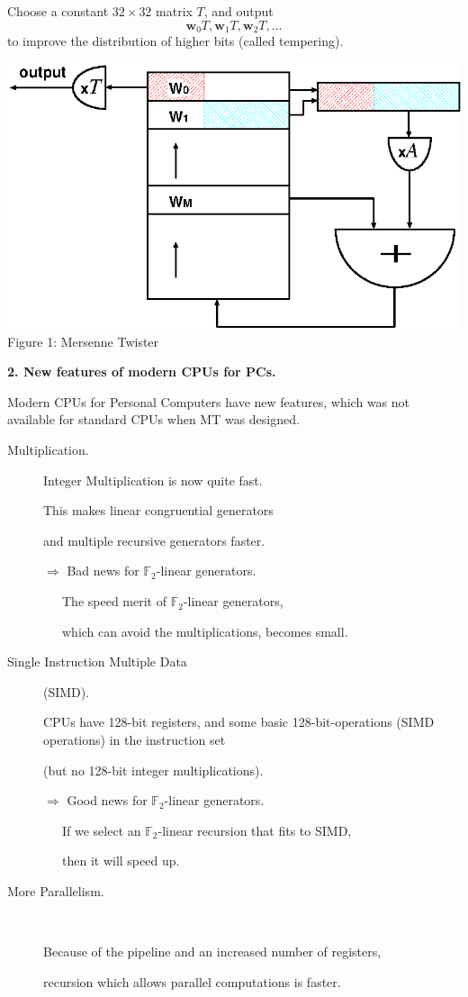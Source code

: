 \documentclass[a4j,12pt,landscape]{jarticle}
\def\F2{{\mathbb F}_2}
\def\bw{{{\mathbf w}}}
\begin{document}
Choose a constant $32\times 32$ matrix $T$, 
and output
$$
\bw_0T , \bw_1T, \bw_2T, \ldots
$$
to improve the distribution of higher bits (called tempering).
\newpage
\begin{center}
\includegraphics[width=0.9\linewidth]{mt-a.eps}
\\
Figure 1: Mersenne Twister
\end{center}
\newpage
\noindent
{\bf 2. New features of modern CPUs for PCs.}

Modern CPUs for Personal Computers have new features, 
which was not available for standard CPUs 
when MT was designed.
\begin{description}
\item[Multiplication.]
Integer Multiplication is now quite fast.

This makes linear congruential generators 

and multiple recursive generators faster.

$\Rightarrow$ 
Bad news for $\F2$-linear generators.

~~~The speed merit of $\F2$-linear generators,

~~~which can avoid the multiplications,
becomes small.

\newpage
\item[Single Instruction Multiple Data] (SIMD).

CPUs have 128-bit registers, and
some basic 128-bit-operations (SIMD operations) in the 
instruction set

(but no 128-bit integer multiplications).

$\Rightarrow$ 
Good news for $\F2$-linear generators.

~~~If we select an $\F2$-linear
recursion that fits to SIMD, 

~~~then it will speed up.

\item[More Parallelism.]
$ $

Because of the pipeline 
and an increased number of registers, 

recursion which allows 
parallel computations is faster.
\end{description}
\end{document}
